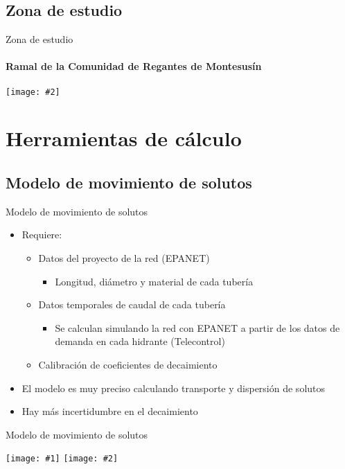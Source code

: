 \documentclass[pdr]{beamer}
\newcommand{\FIGURE}[2]
{
	\begin{center}
		\texttt{[image: \#2]}
	\end{center}
}
\newcommand{\FIGII}[2]
{
	\begin{center}
		\texttt{[image: \#1]}
		\texttt{[image: \#2]}
	\end{center}
}
\begin{document}
\subsection{Zona de estudio}

\begin{frame}{Zona de estudio}
	\framesubtitle{Ramal de la Comunidad de Regantes de Montesusín}
	\FIGURE{0.65\textwidth}{Montesusín.png}
\end{frame}

\section{Herramientas de cálculo}

\subsection{Modelo de movimiento de solutos}

\begin{frame}{Modelo de movimiento de solutos}
	\begin{itemize}
		\item Requiere:
		\begin{itemize}
			\item Datos del proyecto de la red (EPANET)
			\begin{itemize}
				\item Longitud, diámetro y material de cada
					tubería
			\end{itemize}
			\item Datos temporales de caudal de cada tubería
			\begin{itemize}
				\item Se calculan simulando la red con EPANET a
					partir de los datos de demanda en cada
					hidrante (Telecontrol)
			\end{itemize}
			\item Calibración de coeficientes de decaimiento
		\end{itemize}
		\item El modelo es muy preciso calculando transporte y
			dispersión de solutos
		\item Hay más incertidumbre en el decaimiento 
	\end{itemize}
\end{frame}

\begin{frame}{Modelo de movimiento de solutos}
	\FIGII{24-2022-chlorine-constant-0.eps}{24-2022-chlorine-constant-2.eps}
\end{frame}
\end{document}
